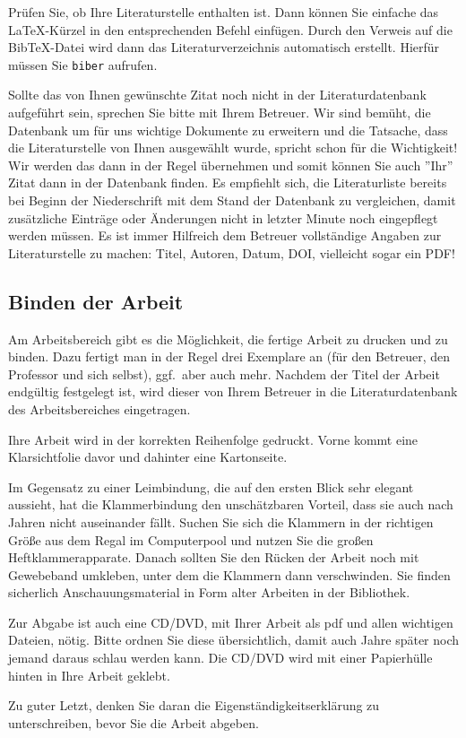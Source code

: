Prüfen Sie, ob Ihre Literaturstelle enthalten ist. 
Dann können Sie einfache das \LaTeX-Kürzel in
den entsprechenden Befehl einfügen. Durch den Verweis auf die
Bib\TeX-Datei wird dann das
Literaturverzeichnis automatisch erstellt. Hierfür müssen Sie \texttt{biber} aufrufen.

Sollte das von Ihnen gewünschte Zitat noch nicht in der
Literaturdatenbank aufgeführt sein, sprechen Sie bitte mit Ihrem
Betreuer. Wir sind bemüht, die Datenbank um für uns wichtige
Dokumente zu erweitern und die Tatsache, dass die Literaturstelle
von Ihnen ausgewählt wurde, spricht schon für die Wichtigkeit! Wir
werden das dann in der Regel übernehmen und somit können Sie auch
''Ihr'' Zitat dann in der Datenbank finden. Es empfiehlt sich, die
Literaturliste bereits bei Beginn der Niederschrift mit dem Stand
der Datenbank zu vergleichen, damit zusätzliche Einträge oder
Änderungen nicht in letzter Minute noch eingepflegt werden müssen.
Es ist immer Hilfreich dem Betreuer vollständige Angaben zur Literaturstelle
zu machen: Titel, Autoren, Datum, DOI, vielleicht sogar ein PDF!


\subsection{Binden der Arbeit}

Am Arbeitsbereich gibt es die Möglichkeit, die fertige Arbeit zu drucken und zu
binden. Dazu fertigt man in der Regel drei Exemplare an (für den
Betreuer, den Professor und sich selbst), ggf.\ aber auch mehr.
Nachdem der Titel der Arbeit endgültig festgelegt ist, wird dieser
von Ihrem Betreuer in die Literaturdatenbank des Arbeitsbereiches
eingetragen. 

Ihre Arbeit wird in der korrekten Reihenfolge gedruckt. Vorne kommt eine Klarsichtfolie davor und dahinter eine Kartonseite.

Im Gegensatz zu einer Leimbindung, die auf den ersten Blick sehr
elegant aussieht, hat die Klammerbindung den unschätzbaren
Vorteil, dass sie auch nach Jahren nicht auseinander fällt. Suchen
Sie sich die Klammern in der richtigen Größe aus dem Regal im Computerpool und nutzen Sie die großen
Heftklammerapparate. Danach sollten Sie den Rücken der Arbeit noch
mit Gewebeband umkleben, unter dem die Klammern dann verschwinden.
Sie finden sicherlich Anschauungsmaterial in Form alter Arbeiten
in der Bibliothek.

Zur Abgabe ist auch eine CD/DVD, mit Ihrer Arbeit als pdf und allen wichtigen Dateien, nötig. Bitte ordnen Sie diese übersichtlich, damit auch Jahre später noch jemand daraus schlau werden kann. Die CD/DVD wird mit einer Papierhülle hinten in Ihre Arbeit geklebt.

Zu guter Letzt, denken Sie daran die Eigenständig\-keits\-erklärung zu unterschreiben, bevor Sie die Arbeit abgeben.